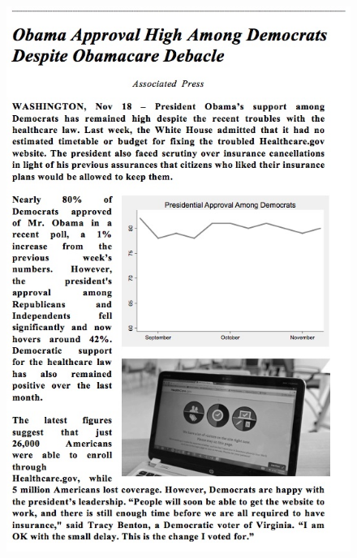 \documentclass[12pt, letterpaper]{article}
\begin{document}
\begin{figure}[ht]
\begin{minipage}[b]{0.45\linewidth}
\includegraphics[width=1\textwidth]{../figs/mturk_1_treats/Dem_T.jpg}
\label{fig:minipage2}
\end{minipage}
\end{figure}
\end{document}
